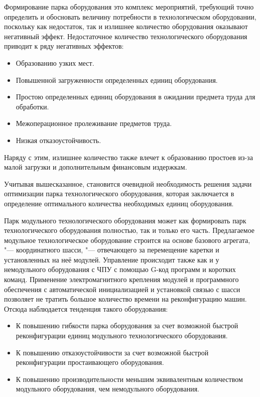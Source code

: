 Формирование парка оборудования это комплекс мероприятий, требующий точно определить и обосновать величину потребности в технологическом оборудовании, поскольку как недостаток, так и излишнее количество оборудования оказывают негативный эффект. Недостаточное количество технологического оборудования  приводит к ряду негативных эффектов:

\begin{itemize}
	\item Образованию узких мест.
	\item Повышенной загруженности определенных единиц оборудования.
	\item Простою определенных единиц оборудования в ожидании предмета труда для обработки.
	\item Межоперационное пролеживание предметов труда.
	\item Низкая отказоустойчивость.
\end{itemize}


Наряду с этим, излишнее количество также влечет к образованию простоев из-за малой загрузки и дополнительным финансовым издержкам. 

Учитывая вышесказанное, становится очевидной необходимость решения задачи оптимизации парка технологического оборудования, которая заключается в  определение оптимального количества необходимых единиц оборудования.

Парк модульного технологического оборудования может как формировать парк технологического оборудования полностью, так и только его часть. Предлагаемое модульное технологическое оборудование строится на основе базового агрегата, "--- координатного шасси, "--- отвечающего за перемещение каретки и установленных на неё модулей. Управление происходит также как и у немодульного оборудования с ЧПУ с помощью G-код программ и коротких команд. Применение электромагнитного крепления модулей и программного обеспечения с автоматической инициализацией и установкой связью с шасси позволяет не тратить большое количество времени на реконфигурацию машин. Отсюда наблюдается тенденция такого оборудования:

\begin{itemize}
	\item К повышению гибкости парка оборудования за счет возможной быстрой реконфигурации единиц модульного технологического оборудования.
	\item К повышению отказоустойчивости за счет возможной быстрой реконфигурации простаивающего оборудования.
	\item К повышению производительности меньшим эквивалентным количеством модульного оборудования, чем немодульного оборудования.
\end{itemize}

